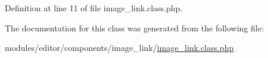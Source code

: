 Definition at line 11 of file image\-\_\-link.\-class.\-php.



The documentation for this class was generated from the following file\-:\begin{DoxyCompactItemize}
\item 
modules/editor/components/image\-\_\-link/\hyperlink{image__link_8class_8php}{image\-\_\-link.\-class.\-php}\end{DoxyCompactItemize}
